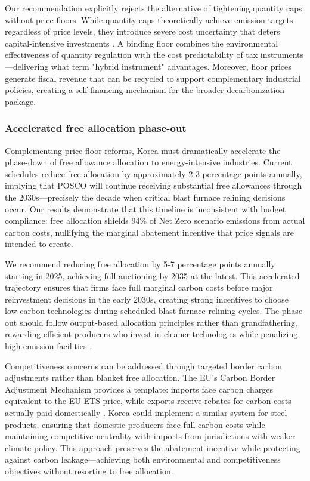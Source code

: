 \documentclass[preprint,1p,authoryear]{elsarticle}
\begin{document}
Our recommendation explicitly rejects the alternative of tightening quantity caps without price floors. While quantity caps theoretically achieve emission targets regardless of price levels, they introduce severe cost uncertainty that deters capital-intensive investments \citep{fowlie2016carbon}. A binding floor combines the environmental effectiveness of quantity regulation with the cost predictability of tax instruments—delivering what \citet{martin2016industry} term "hybrid instrument" advantages. Moreover, floor prices generate fiscal revenue that can be recycled to support complementary industrial policies, creating a self-financing mechanism for the broader decarbonization package.

\subsubsection{Accelerated free allocation phase-out}

Complementing price floor reforms, Korea must dramatically accelerate the phase-down of free allowance allocation to energy-intensive industries. Current schedules reduce free allocation by approximately 2-3 percentage points annually, implying that POSCO will continue receiving substantial free allowances through the 2030s—precisely the decade when critical blast furnace relining decisions occur. Our results demonstrate that this timeline is inconsistent with budget compliance: free allocation shields 94\% of Net Zero scenario emissions from actual carbon costs, nullifying the marginal abatement incentive that price signals are intended to create.

We recommend reducing free allocation by 5-7 percentage points annually starting in 2025, achieving full auctioning by 2035 at the latest. This accelerated trajectory ensures that firms face full marginal carbon costs before major reinvestment decisions in the early 2030s, creating strong incentives to choose low-carbon technologies during scheduled blast furnace relining cycles. The phase-out should follow output-based allocation principles rather than grandfathering, rewarding efficient producers who invest in cleaner technologies while penalizing high-emission facilities \citep{sartor2012benchmark}.

Competitiveness concerns can be addressed through targeted border carbon adjustments rather than blanket free allocation. The EU's Carbon Border Adjustment Mechanism provides a template: imports face carbon charges equivalent to the EU ETS price, while exports receive rebates for carbon costs actually paid domestically \citep{wang2021carbon}. Korea could implement a similar system for steel products, ensuring that domestic producers face full carbon costs while maintaining competitive neutrality with imports from jurisdictions with weaker climate policy. This approach preserves the abatement incentive while protecting against carbon leakage—achieving both environmental and competitiveness objectives without resorting to free allocation.
\end{document}
